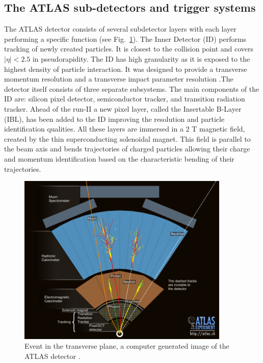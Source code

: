 \subsection{ The ATLAS sub-detectors and trigger systems}

The ATLAS detector consists of several subdetector layers with each layer performing a specific function (see Fig.~\ref{fig:event}). The Inner Detector (ID) performs tracking of newly created particles. It is closest to the collision point and covers $|\eta|<2.5$ in pseudorapidity. The ID has high granularity as it is exposed to the highest density of particle interaction. It was designed to provide a transverse momentum resolution and a transverse impact parameter resolution \citep{aad2010atlas}.The detector itself consists of three separate subsystems. The main components of the ID are: silicon pixel detector, semiconductor tracker, and transition radiation tracker. Ahead of the run-II a new pixel layer, called the Insertable B-Layer (IBL), has been added to the ID improving the resolution and particle identification qualities. All these layers are immersed in a 2 T magnetic field, created by the thin superconducting solenoidal magnet. This field is parallel to the beam axis and bends trajectories of charged particles allowing their charge and momentum identification based on the characteristic bending of their trajectories. 
\begin{figure}[!h]
	\centering
    \captionsetup{width=0.9\textwidth}
	\includegraphics[width=0.9\textwidth]{Chap2/0803022_01.jpg}
\caption[Event in the transverse plane]{\label{fig:event} Event in the transverse plane, a computer generated image of the ATLAS detector \cite{event}. }
\end{figure}

